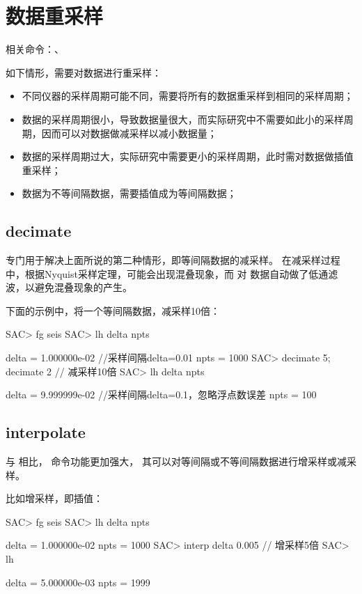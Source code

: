 \section{数据重采样}
相关命令：、

如下情形，需要对数据进行重采样：
\begin{itemize}
\item 不同仪器的采样周期可能不同，需要将所有的数据重采样到相同的采样周期；
\item 数据的采样周期很小，导致数据量很大，而实际研究中不需要如此小的采样周期，因而可以对数据做减采样以减小数据量；
\item 数据的采样周期过大，实际研究中需要更小的采样周期，此时需对数据做插值重采样；
\item 数据为不等间隔数据，需要插值成为等间隔数据；
\end{itemize}

\subsection{decimate}
 专门用于解决上面所说的第二种情形，即等间隔数据的减采样。
在减采样过程中，根据Nyquist采样定理，可能会出现混叠现象，而  对
数据自动做了低通滤波，以避免混叠现象的产生。

下面的示例中，将一个等间隔数据，减采样10倍：
\begin{SACCode}
SAC> fg seis
SAC> lh delta npts

     delta = 1.000000e-02       //采样间隔delta=0.01
      npts = 1000
SAC> decimate 5; decimate 2     // 减采样10倍
SAC> lh delta npts

     delta = 9.999999e-02       //采样间隔delta=0.1，忽略浮点数误差
      npts = 100
\end{SACCode}

\subsection{interpolate}
与  相比， 命令功能更加强大，
其可以对等间隔或不等间隔数据进行增采样或减采样。

比如增采样，即插值：
\begin{SACCode}
SAC> fg seis
SAC> lh delta npts

     delta = 1.000000e-02
     npts = 1000
SAC> interp delta 0.005         // 增采样5倍
SAC> lh

     delta = 5.000000e-03
     npts = 1999
\end{SACCode}


